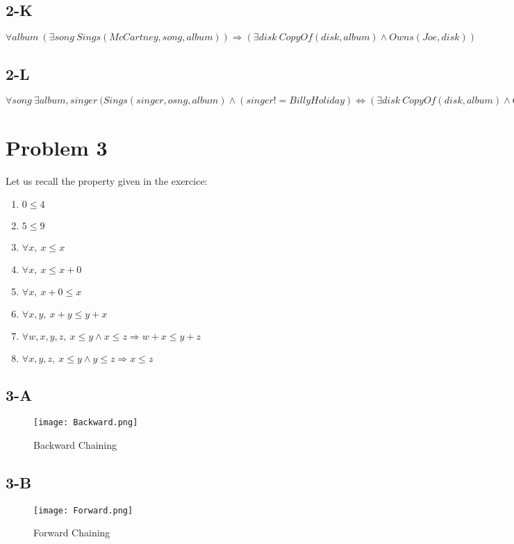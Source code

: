 \documentclass{article}
\begin{document}
        \subsection{2-K}
            $\forall album\: (\exists song\: Sings(McCartney, song, album))\Rightarrow(\exists disk\: CopyOf(disk, album)\land Owns(Joe, disk))$
        \subsection{2-L}
            $\forall song\: \exists album, singer\: (Sings(singer, osng, album)\land(singer!=Billy Holiday) \Leftrightarrow (\exists disk\: CopyOf(disk, album)\land Owns(Joe, disk))$
    \section{Problem 3}
        Let us recall the property given in the exercice:
        \begin{enumerate}
            \item $0\le 4$
            \item $5\le 9$
            \item $\forall x,\: x\le x$
            \item $\forall x,\: x\le x+0$
            \item $\forall x,\: x+0\le x$
            \item $\forall x,y,\: x+y\le y+x$
            \item $\forall w,x,y,z,\: x\le y\land x\le z \Rightarrow w+x\le y+z$
            \item $\forall x,y,z,\: x\le y\land y\le z\Rightarrow x\le z$
        \end{enumerate}
        \subsection{3-A}
            \begin{figure}[ht!]
                \centering
                \texttt{[image: Backward.png]}
                \caption{Backward Chaining}
            \end{figure}
        \subsection{3-B}
            \begin{figure}[ht!]
                \centering
                \texttt{[image: Forward.png]}
                \caption{Forward Chaining}
            \end{figure}
\end{document}
